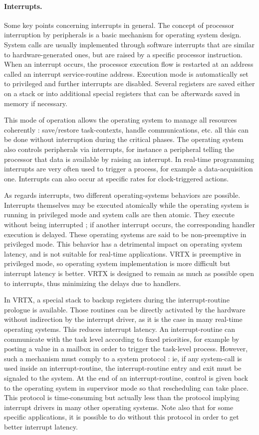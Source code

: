 \documentclass[10pt]{report}
\begin{document}
\paragraph{Interrupts.} Some key points concerning interrupts in general. The concept of
processor interruption by peripherals is a basic mechanism for
operating system design. System calls are usually implemented
through software interrupts that are similar to
hardware-generated ones, but are raised by a specific processor
instruction. When an interrupt occurs, the processor execution
flow is restarted at an address called an interrupt service-routine 
address. Execution mode is automatically set to
privileged and further interrupts are disabled. Several registers
are saved either on a stack or into additional special registers
that can be afterwards saved in memory if necessary.

This mode of operation allows the operating system to manage all
resources coherently : save/restore task-contexts, handle
communications, etc. all this can be done without interruption
during the critical phases. The operating system also controls
peripherals via interrupts, for instance a peripheral
telling the processor that data is available by raising an
interrupt. In real-time programming interrupts are very often
used to trigger a process, for example a data-acquisition one.
Interrupts can also occur at specific rates for clock-triggered
actions.

As regards interrupts, two different operating-systems behaviors
are possible. Interrupts themselves may be executed atomically while
the operating system is running in privileged mode and system
calls are then atomic. They execute without being interrupted ;
if another interrupt occurs, the corresponding handler execution is
delayed. These operating systems are said to be non-preemptive in
privileged mode. This behavior has a detrimental impact on
operating system latency, and is not suitable for real-time
applications. VRTX is preemptive in privileged mode, so operating
system implementation is more difficult but interrupt latency is
better. VRTX is designed to remain as much as possible open to 
interrupts, thus minimizing the delays due to handlers.

In VRTX, a special stack to backup registers during the 
interrupt-routine prologue is available. Those routines can be
directly activated by the hardware without indirection by the interrupt
driver, as it is the case in many real-time operating systems.
This reduces interrupt latency. An interrupt-routine can
communicate with the task level according to fixed priorities,
for example by posting a value in a mailbox in order to trigger the
task-level process. However, such a mechanism must comply to a
system protocol : ie, if any system-call is used inside an
interrupt-routine, the interrupt-routine entry and exit must be
signaled to the system. At the end of an interrupt-routine, control
is given back to the operating system in supervisor mode so that
rescheduling can take place. This protocol is time-consuming but
actually less than the protocol implying interrupt drivers in
many other operating systems. Note also that for some specific
applications, it is possible to do without this protocol in order
to get better interrupt latency.
\end{document}
